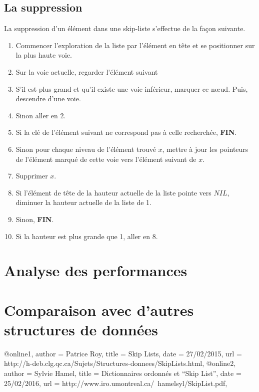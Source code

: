 \documentclass[hidelinks,a4paper, 12pt]{article}
\begin{document}
	\subsection{La suppression}
	La suppression d'un élément dans une skip-liste s'effectue de la façon suivante.
	\begin{enumerate}
		\item Commencer l'exploration de la liste par l'élément en tête et se positionner sur la plus haute voie.
		\item Sur la voie actuelle, regarder l'élément suivant
		\item S'il est plus grand et qu'il existe une voie inférieur, marquer ce nœud. Puis, descendre d'une voie.
		\item Sinon aller en 2.
		\item Si la clé de l'élément suivant ne correspond pas à celle recherchée, \textbf{FIN}.
		\item Sinon pour chaque niveau de l'élément trouvé $x$, mettre à jour les pointeurs de l'élément marqué de cette voie vers l'élément suivant de $x$.
		\item Supprimer $x$.
		\item Si l'élément de tête de la hauteur actuelle de la liste pointe vers $NIL$, diminuer la hauteur actuelle de la liste de 1.
		\item Sinon, \textbf{FIN}.
		\item Si la hauteur est plus grande que 1, aller en 8.
	\end{enumerate}
	
	
	\section{Analyse des performances}\label{perf}
	\section{Comparaison avec d'autres structures de données}
	
	@online{1,
		author = {Patrice Roy},
		title = {Skip Lists},
		date = {27/02/2015},
		url = {http://h-deb.clg.qc.ca/Sujets/Structures-donnees/SkipLists.html},
	}
	@online{2,
		author = {Sylvie Hamel},
		title = {Dictionnaires ordonnés et “Skip List”},
		date = {25/02/2016},
		url = {http://www.iro.umontreal.ca/~hamelsyl/SkipList.pdf},
	}
	
\end{document}
